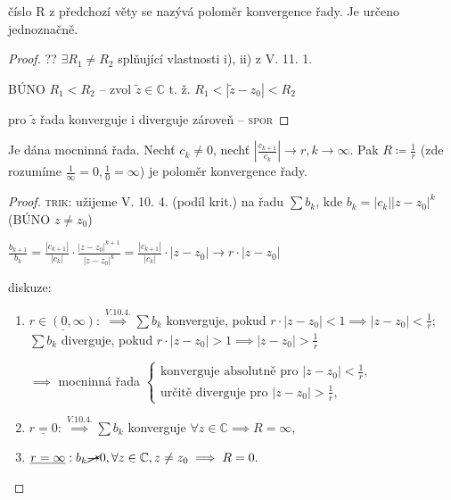 \begin{poznamka}
    číslo R z předchozí věty se nazývá poloměr konvergence řady. Je určeno jednoznačně.
\end{poznamka}

\begin{proof}
    ?? $\exists R_1 \neq R_2$ splňující vlastnosti i), ii) z V. 11. 1.

    BÚNO $R_1<R_2$ -- zvol $\tilde{z} \in \mathbb C$ t. ž. $R_1<|\tilde{z}-z_0|<R_2$

    pro $\tilde{z}$ řada konverguje i diverguje zároveň -- \textsc{spor} \Lightning
\end{proof}

\begin{veta}
    Je dána mocninná řada. Nechť $c_k \neq 0$, nechť $|\frac{c_{k+1}}{c_k}|\to r, k \to \infty$. Pak $R \coloneq \frac{1}{r}$ (zde rozumíme $\frac{1}{\infty}=0, \frac{1}{0}= \infty$) je poloměr konvergence řady.
\end{veta}

\begin{proof}
    \textsc{trik}: užijeme V. 10. 4. (podíl krit.) na řadu $\sum b_k$, kde $b_k = |c_k||z-z_0|^k$ (BÚNO $z\neq z_0$)

    $\frac{b_{k+1}}{b_k}=\frac{|c_{k+1}|}{|c_k|}\cdot \frac{|z-z_0|^{k+1}}{|z-z_0|^k}= \frac{|c_{k+1}|}{|c_k|}\cdot |z-z_0| \to r \cdot |z-z_0|$

      diskuze: \begin{enumerate}[1.]
     \item $\underline{r \in (0, \infty)}: \stackrel{V. 10. 4.}{\implies} \sum b_k$ konverguje, pokud $r\cdot|z-z_0|<1 \implies |z-z_0| < \frac{1}{r}$; $\sum b_k$ diverguje, pokud $r\cdot|z-z_0|>1 \implies |z-z_0| > \frac{1}{r}$

     $\implies$ mocninná řada $\begin{cases}
       \text{konverguje absolutně pro } |z-z_0| <\frac{1}{r},& \\\text{určitě diverguje pro } |z-z_0| >\frac{1}{r},&
       \end{cases}$
     \item $\underline{r=0}: \stackrel{V. 10. 4.}{\implies} \sum b_k$ konverguje $\forall z \in \mathbb C\implies R = \infty$,
     \item $\underline{r= \infty}: b_k \cancel{\to} 0, \forall z \in \mathbb C, z \neq z_0 \implies R = 0.$
   \end{enumerate}
\end{proof}

